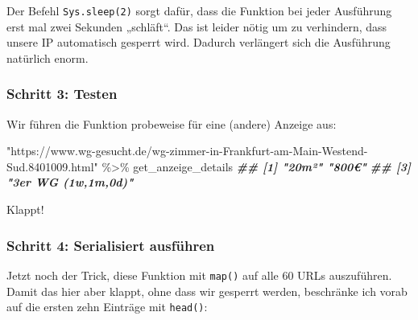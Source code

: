 \documentclass[
  ngerman,
]{article}
\newenvironment{Shaded}{\begin{snugshade}}{\end{snugshade}}
\newcommand{\DocumentationTok}[1]{\textcolor[rgb]{0.56,0.35,0.01}{\textbf{\textit{#1}}}}
\newcommand{\NormalTok}[1]{#1}
\newcommand{\SpecialCharTok}[1]{\textcolor[rgb]{0.00,0.00,0.00}{#1}}
\newcommand{\StringTok}[1]{\textcolor[rgb]{0.31,0.60,0.02}{#1}}
\begin{document}
Der Befehl \texttt{Sys.sleep(2)} sorgt dafür, dass die Funktion bei jeder Ausführung erst mal zwei Sekunden „schläft``. Das ist leider nötig um zu verhindern, dass unsere IP automatisch gesperrt wird. Dadurch verlängert sich die Ausführung natürlich enorm.

\hypertarget{schritt-3-testen-1}{%
\subsubsection{Schritt 3: Testen}\label{schritt-3-testen-1}}

Wir führen die Funktion probeweise für eine (andere) Anzeige aus:

\begin{Shaded}
\begin{Highlighting}[]
\StringTok{"https://www.wg{-}gesucht.de/wg{-}zimmer{-}in{-}Frankfurt{-}am{-}Main{-}Westend{-}Sud.8401009.html"} \SpecialCharTok{\%\textgreater{}\%}
\NormalTok{  get\_anzeige\_details}
\DocumentationTok{\#\# [1] "20m²"              "800€"             }
\DocumentationTok{\#\# [3] "3er WG (1w,1m,0d)"}
\end{Highlighting}
\end{Shaded}

Klappt!

\hypertarget{schritt-4-serialisiert-ausfuxfchren-1}{%
\subsubsection{Schritt 4: Serialisiert ausführen}\label{schritt-4-serialisiert-ausfuxfchren-1}}

Jetzt noch der Trick, diese Funktion mit \texttt{map()} auf alle 60 URLs auszuführen. Damit das hier aber klappt, ohne dass wir gesperrt werden, beschränke ich vorab auf die ersten zehn Einträge mit \texttt{head()}:
\end{document}

